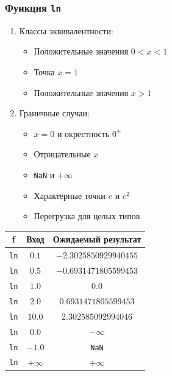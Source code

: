 \documentclass[12pt,a4paper]{report}
\begin{document}
\subsubsection*{Функция \texttt{ln}}
\begin{enumerate}
    \item Классы эквивалентности:
          \begin{itemize}
              \item Положительные значения $0 < x < 1$
              \item Точка $x=1$
              \item Положительные значения $x > 1$
          \end{itemize}
    \item Граничные случаи:
          \begin{itemize}
              \item $x=0$ и окрестность $0^+$
              \item Отрицательные $x$
              \item \texttt{NaN} и $+\infty$
              \item Характерные точки $e$ и $e^2$
              \item Перегрузка для целых типов
          \end{itemize}
\end{enumerate}
\begin{center}
    \begin{tabular}{|c|c|c|}
        \hline
        \textbf{f} & \textbf{Вход} & \textbf{Ожидаемый результат} \\
        \hline
        \texttt{ln} & $0.1$ & $-2.3025850929940455$ \\
        \hline
        \texttt{ln} & $0.5$ & $-0.6931471805599453$ \\
        \hline
        \texttt{ln} & $1.0$ & $0.0$ \\
        \hline
        \texttt{ln} & $2.0$ & $0.6931471805599453$ \\
        \hline
        \texttt{ln} & $10.0$ & $2.302585092994046$ \\
        \hline
        \texttt{ln} & $0.0$ & $-\infty$ \\
        \hline
        \texttt{ln} & $-1.0$ & \texttt{NaN} \\
        \hline
        \texttt{ln} & $+\infty$ & $+\infty$ \\
        \hline
    \end{tabular}
\end{center}
\end{document}
